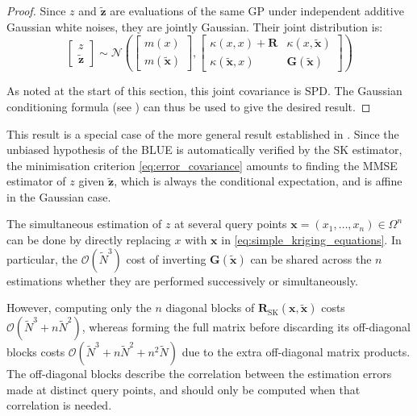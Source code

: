 \begin{proof}
	Since $z$ and $\tilde{\mathbf{z}}$ are evaluations of the same GP under independent additive Gaussian white noises, they are jointly Gaussian. Their joint distribution is:
	\begin{equation}
		\begin{bmatrix}
		z\\\tilde{\mathbf{z}}
		\end{bmatrix}\sim\mathcal{N}\left(\begin{bmatrix}
		m(x)\\m(\tilde{\mathbf{x}})
		\end{bmatrix},\begin{bmatrix}
		\kappa(x,x)+\mathbf{R}&\kappa(x,\tilde{\mathbf{x}})\\\kappa(\tilde{\mathbf{x}},x)&\mathbf{G}(\tilde{\mathbf{x}})
		\end{bmatrix}\right)
	\end{equation}

	As noted at the start of this section, this joint covariance is SPD. The Gaussian conditioning formula (see ) can thus be used to give the desired result.
\end{proof}

This result is a special case of the more general result established in . Since the unbiased hypothesis of the BLUE is automatically verified by the SK estimator, the minimisation criterion \eqref{eq:error_covariance} amounts to finding the MMSE estimator of $z$ given $\tilde{\mathbf{z}}$, which is always the conditional expectation, and is affine in the Gaussian case.

\begin{remark}
	The simultaneous estimation of $z$ at several query points $\mathbf{x}=(x_1,\dots,x_n)\in\Omega^n$ can be done by directly replacing $x$ with $\mathbf{x}$ in \eqref{eq:simple_kriging_equations}. In particular, the $\mathcal{O}\left(\tilde{N}^3\right)$ cost of inverting $\mathbf{G}(\tilde{\mathbf{x}})$ can be shared across the $n$ estimations whether they are performed successively or simultaneously.

	However, computing only the $n$ diagonal blocks of $\mathbf{R}_{\mathrm{SK}}(\mathbf{x},\tilde{\mathbf{x}})$ costs $\mathcal{O}(\tilde{N}^3+n\tilde{N}^2)$, whereas forming the full matrix before discarding its off-diagonal blocks costs $\mathcal{O}(\tilde{N}^3+n\tilde{N}^2+n^2\tilde{N})$ due to the extra off-diagonal matrix products. The off-diagonal blocks describe the correlation between the estimation errors made at distinct query points, and should only be computed when that correlation is needed.
\end{remark}

